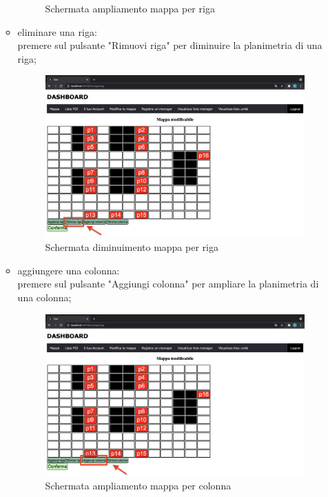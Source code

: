 \begin{itemize}
\begin{itemize}
\begin{figure}[H]
                \caption{Schermata ampliamento mappa per riga}
            \end{figure}
            \item eliminare una riga: \\premere sul pulsante "Rimuovi riga" per diminuire la planimetria di una riga;
            \begin{figure}[H]
                \centering
                \includegraphics[scale=0.12]{res/images/modificamappa2.png}
                \caption{Schermata diminuimento mappa per riga}
            \end{figure}
            \item aggiungere una colonna: \\premere sul pulsante "Aggiungi colonna" per ampliare la planimetria di una colonna;
            \begin{figure}[H]
                \centering
                \includegraphics[scale=0.12]{res/images/modificamappa3.png}
                \caption{Schermata ampliamento mappa per colonna}

\end{figure}
\end{itemize}
\end{itemize}
